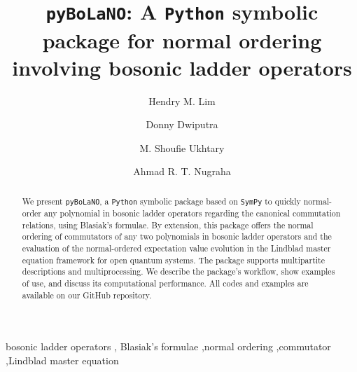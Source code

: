 \documentclass[onecolumn, 12pt, sort&compress]{elsarticle}
\newcounter{bla}
\newenvironment{revision}{%
\color{red}
}
{}
\begin{document}
\sloppy

\begin{frontmatter}

\title{\texttt{pyBoLaNO}: A \texttt{Python} symbolic package for normal ordering involving bosonic ladder operators}

\author[a,b]{Hendry M. Lim}
\author[c,a]{Donny Dwiputra}
\author[a]{M. Shoufie Ukhtary}
\author[a,d]{Ahmad R. T. Nugraha}

\address[a]{Research Center for Quantum Physics, National Research and Innovation Agency (BRIN), South Tangerang 15314, Indonesia}
\address[b]{Department of Physics, Faculty of Mathematics and Natural Sciences, Universitas Indonesia, Depok 16424, Indonesia}
\address[c]{Asia Pacific Center for Theoretical Physics, Pohang 37673, Korea}
\address[d]{Department of Engineering Physics, Telkom University, Bandung 40257, Indonesia}


\begin{abstract}
We present \texttt{pyBoLaNO}, a \texttt{Python} symbolic package based on \texttt{SymPy} to quickly normal-order any polynomial in bosonic ladder operators \begin{revision}regarding the canonical commutation relations, using Blasiak's formulae\end{revision}. By extension, this package offers the normal ordering of commutators of any two polynomials in bosonic ladder operators and the evaluation of the normal-ordered expectation value evolution in the Lindblad master equation framework for open quantum systems. The package supports multipartite descriptions and multiprocessing. We describe the package's workflow, show examples of use, and discuss its computational performance. All codes and examples are available on our GitHub repository.
\end{abstract}


\begin{keyword}
bosonic ladder operators \sep \begin{revision}Blasiak's formulae\end{revision} \sep normal ordering \sep commutator \sep Lindblad master equation

\end{keyword}

\end{frontmatter}
\end{document}
